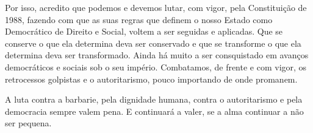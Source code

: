 Por isso, acredito que podemos e devemos lutar, com vigor, pela
Constituição de 1988, fazendo com que as suas regras que definem o nosso
Estado como Democrático de Direito e Social, voltem a ser seguidas e
aplicadas. Que se conserve o que ela determina deva ser conservado e que
se transforme o que ela determina deva ser transformado. Ainda há muito
a ser consquistado em avanços democráticos e sociais sob o seu império.
Combatamos, de frente e com vigor, os retrocessos golpistas e o
autoritarismo, pouco importando de onde promanem.

A luta contra a barbarie, pela dignidade humana, contra o autoritarismo
e pela democracia sempre valem pena. E continuará a valer, se a alma
continuar a não ser pequena.

